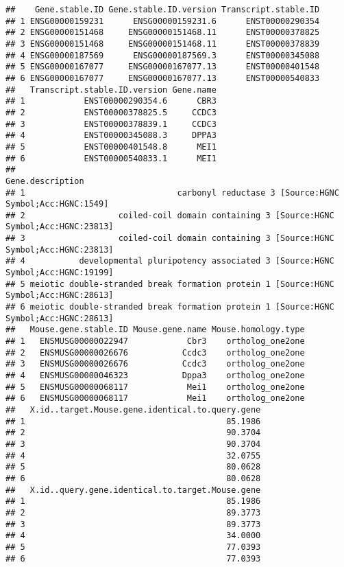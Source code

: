 \documentclass[
]{article}
\begin{document}
\begin{verbatim}
##    Gene.stable.ID Gene.stable.ID.version Transcript.stable.ID
## 1 ENSG00000159231      ENSG00000159231.6      ENST00000290354
## 2 ENSG00000151468     ENSG00000151468.11      ENST00000378825
## 3 ENSG00000151468     ENSG00000151468.11      ENST00000378839
## 4 ENSG00000187569      ENSG00000187569.3      ENST00000345088
## 5 ENSG00000167077     ENSG00000167077.13      ENST00000401548
## 6 ENSG00000167077     ENSG00000167077.13      ENST00000540833
##   Transcript.stable.ID.version Gene.name
## 1            ENST00000290354.6      CBR3
## 2            ENST00000378825.5     CCDC3
## 3            ENST00000378839.1     CCDC3
## 4            ENST00000345088.3     DPPA3
## 5            ENST00000401548.8      MEI1
## 6            ENST00000540833.1      MEI1
##                                                                        Gene.description
## 1                               carbonyl reductase 3 [Source:HGNC Symbol;Acc:HGNC:1549]
## 2                   coiled-coil domain containing 3 [Source:HGNC Symbol;Acc:HGNC:23813]
## 3                   coiled-coil domain containing 3 [Source:HGNC Symbol;Acc:HGNC:23813]
## 4           developmental pluripotency associated 3 [Source:HGNC Symbol;Acc:HGNC:19199]
## 5 meiotic double-stranded break formation protein 1 [Source:HGNC Symbol;Acc:HGNC:28613]
## 6 meiotic double-stranded break formation protein 1 [Source:HGNC Symbol;Acc:HGNC:28613]
##   Mouse.gene.stable.ID Mouse.gene.name Mouse.homology.type
## 1   ENSMUSG00000022947            Cbr3    ortholog_one2one
## 2   ENSMUSG00000026676           Ccdc3    ortholog_one2one
## 3   ENSMUSG00000026676           Ccdc3    ortholog_one2one
## 4   ENSMUSG00000046323           Dppa3    ortholog_one2one
## 5   ENSMUSG00000068117            Mei1    ortholog_one2one
## 6   ENSMUSG00000068117            Mei1    ortholog_one2one
##   X.id..target.Mouse.gene.identical.to.query.gene
## 1                                         85.1986
## 2                                         90.3704
## 3                                         90.3704
## 4                                         32.0755
## 5                                         80.0628
## 6                                         80.0628
##   X.id..query.gene.identical.to.target.Mouse.gene
## 1                                         85.1986
## 2                                         89.3773
## 3                                         89.3773
## 4                                         34.0000
## 5                                         77.0393
## 6                                         77.0393

\end{verbatim}
\end{document}
